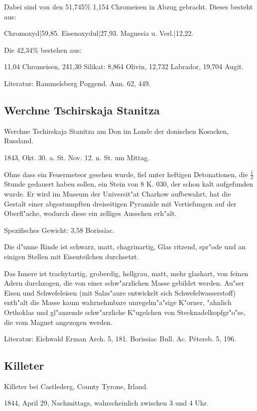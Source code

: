 \documentclass[a4paper, 11pt, oneside]{article}
\begin{document}
Dabei sind von den 51,745\% 1,154 Chromeisen in Abzug gebracht. Dieses besteht aus:

Chromoxyd|59,85.  
Eisenoxydul|27,93.  
Magnesia u. Verl.|12,22.

Die 42,34\% bestehen aus:

1\. 1,04 Chromeisen,  
2\. 41,30 Silikat:  
8,864 Olivin,  
12,732 Labrador,  
19,704 Augit.

Literatur: Rammelsberg Poggend. Ann. 62, 449.

\subsection{Werchne Tschirskaja Stanitza}

Werchne Tschirskaja Stanitza am Don im Lande der donischen Kosacken, Russland.

1843, Okt. 30. a. St. Nov. 12. n. St. um Mittag.

Ohne dass ein Feuermeteor gesehen wurde, fiel unter heftigen Detonationen, die $\frac{1}{2}$ Stunde gedauert haben sollen, ein Stein von 8 K. 030, der schon kalt aufgefunden wurde. Er wird im Museum der Universit"at Charkow aufbewahrt, hat die Gestalt einer abgestumpften dreiseitigen Pyramide mit Vertiefungen auf der Oberfl"ache, wodurch diese ein zelliges Aussehen erh"alt.

Spezifisches Gewicht: 3,58 Borissiac.

Die d"unne Rinde ist schwarz, matt, chagrinartig, Glas ritzend, spr"ode und an einigen Stellen mit Eisenteilchen durchsetzt.

Das Innere ist trachytartig, groberdig, hellgrau, matt, mehr glashart, von feinen Adern durchzogen, die von einer schw"arzlichen Masse gebildet werden. Au"ser Eisen und Schwefeleisen (mit Salzs"aure entwickelt sich Schwefelwasserstoff) enth"alt die Masse kaum wahrnehmbare unregelm"a"sige K"orner, "ahnlich Orthoklas und gl"anzende schw"arzliche K"ugelchen von Stecknadelkopfgr"o"se, die vom Magnet angezogen werden.

Literatur: Eichwald Erman Arch. 5, 181. Borissiac Bull. Ac. Pétersb. 5, 196.

\subsection{Killeter}

Killeter bei Castlederg, County Tyrone, Irland.

1844, April 29, Nachmittags, wahrscheinlich zwischen 3 und 4 Uhr.
\end{document}
